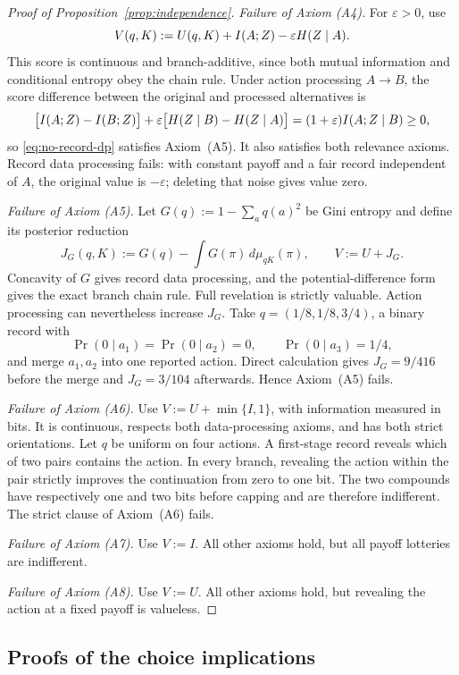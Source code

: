\begin{proof}[Proof of Proposition~\ref{prop:independence}]
\emph{Failure of Axiom \textup{(A4)}.}
For $\varepsilon>0$, use
\begin{equation}
 V(q,K):=U(q,K)+I(A;Z)-\varepsilon H(Z\mid A).
 \label{eq:no-record-dp}
\end{equation}
This score is continuous and branch-additive, since both mutual information and conditional entropy obey the chain
rule.  Under action processing $A\to B$, the score difference between the original and processed alternatives is
\[
 \bigl[I(A;Z)-I(B;Z)\bigr]
 +\varepsilon\bigl[H(Z\mid B)-H(Z\mid A)\bigr]
 =(1+\varepsilon)I(A;Z\mid B)\ge0,
\]
so \eqref{eq:no-record-dp} satisfies Axiom~\textup{(A5)}.  It also satisfies both relevance axioms.  Record data
processing fails: with constant payoff and a fair record independent of $A$, the original value is $-\varepsilon$;
deleting that noise gives value zero.

\emph{Failure of Axiom \textup{(A5)}.}
Let $G(q):=1-\sum_aq(a)^2$ be Gini entropy and define its posterior reduction
\[
 J_G(q,K):=G(q)-\int G(\pi)\,d\mu_{qK}(\pi),
 \qquad V:=U+J_G.
\]
Concavity of $G$ gives record data processing, and the potential-difference form gives the exact branch chain rule.
Full revelation is strictly valuable.  Action processing can nevertheless increase $J_G$.  Take
$q=(1/8,1/8,3/4)$, a binary record with
\[
 \Pr(0\mid a_1)=\Pr(0\mid a_2)=0,
 \qquad \Pr(0\mid a_3)=1/4,
\]
and merge $a_1,a_2$ into one reported action.  Direct calculation gives $J_G=9/416$ before the merge and
$J_G=3/104$ afterwards.  Hence Axiom~\textup{(A5)} fails.

\emph{Failure of Axiom \textup{(A6)}.}
Use $V:=U+\min\{I,1\}$, with information measured in bits.  It is continuous, respects both data-processing axioms,
and has both strict orientations.  Let $q$ be uniform on four actions.  A first-stage record reveals which of two pairs
contains the action.  In every branch, revealing the action within the pair strictly improves the continuation from
zero to one bit.  The two compounds have respectively one and two bits before capping and are therefore indifferent.
The strict clause of Axiom~\textup{(A6)} fails.

\emph{Failure of Axiom \textup{(A7)}.}
Use $V:=I$.  All other axioms hold, but all payoff lotteries are indifferent.

\emph{Failure of Axiom \textup{(A8)}.}
Use $V:=U$.  All other axioms hold, but revealing the action at a fixed payoff is valueless.
\end{proof}

\subsection{Proofs of the choice implications}\label{app:choice-proofs}

